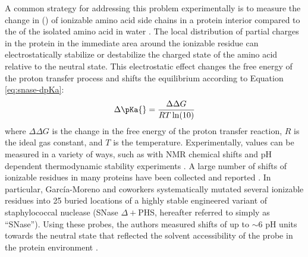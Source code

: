 A common strategy for addressing this problem experimentally is to measure the change in \pKa{} (\dpKa{}) of ionizable amino acid side chains in a protein interior compared to the \pKa{} of the isolated amino acid in water \cite{Bradbury1966, Forsyth2002, Isom2010, Langsetmo1991, Markley1975}. 
The local distribution of partial charges in the protein in the immediate area around the ionizable residue can electrostatically stabilize or destabilize the charged state of the amino acid relative to the neutral state. 
This electrostatic effect changes the free energy of the proton transfer process and shifts the equilibrium according to Equation \ref{eq:snase-dpKa}:
\begin{equation}
    \Delta \pKa{} = \frac{\Delta \Delta G}{R T \ln(10)}
\label{eq:snase-dpKa}
\end{equation}
where $\Delta \Delta G$ is the change in the free energy of the proton transfer reaction, $R$ is the ideal gas constant, and $T$ is the temperature. 
Experimentally, \dpKa{} values can be measured in a variety of ways, such as with NMR chemical shifts and pH dependent thermodynamic stability experiments \cite{Bradbury1966, Markley1975, Isom2008}. 
A large number of \pKa{} shifts of ionizable residues in  many proteins have been collected and reported \cite{Grimsley2009}. 
In particular, Garc\'ia-Moreno and coworkers systematically mutated several ionizable residues into 25 buried locations of a highly stable engineered variant of staphylococcal nuclease (SNase $\Delta+$PHS, hereafter referred to simply as ``SNase''). 
Using these \pKa{} probes, the authors measured shifts of up to $\sim$6 pH units towards the neutral state that reflected the solvent accessibility of the probe in the protein environment \cite{Isom2010, Isom2008, Harms2009, Isom2011}. 

